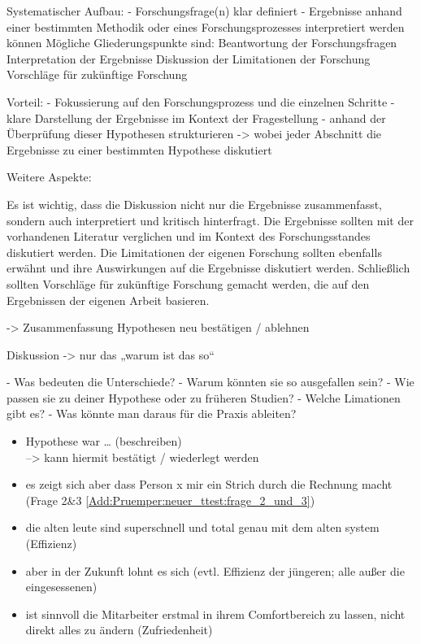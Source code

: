 


Systematischer Aufbau:
- Forschungsfrage(n) klar definiert
- Ergebnisse anhand einer bestimmten Methodik oder eines Forschungsprozesses interpretiert werden können
Mögliche Gliederungspunkte sind:
Beantwortung der Forschungsfragen
Interpretation der Ergebnisse
Diskussion der Limitationen der Forschung
Vorschläge für zukünftige Forschung

Vorteil:
- Fokussierung auf den Forschungsprozess und die einzelnen Schritte
- klare Darstellung der Ergebnisse im Kontext der Fragestellung
- anhand der Überprüfung dieser Hypothesen strukturieren
-> wobei jeder Abschnitt die Ergebnisse zu einer bestimmten Hypothese diskutiert 

Weitere Aspekte:

    Es ist wichtig, dass die Diskussion nicht nur die Ergebnisse zusammenfasst, sondern auch interpretiert und kritisch hinterfragt.
    Die Ergebnisse sollten mit der vorhandenen Literatur verglichen und im Kontext des Forschungsstandes diskutiert werden.
    Die Limitationen der eigenen Forschung sollten ebenfalls erwähnt und ihre Auswirkungen auf die Ergebnisse diskutiert werden.
    Schließlich sollten Vorschläge für zukünftige Forschung gemacht werden, die auf den Ergebnissen der eigenen Arbeit basieren. 

-> Zusammenfassung Hypothesen neu bestätigen / ablehnen

Diskussion
->	nur das „warum ist das so“

- Was bedeuten die Unterschiede?
- Warum könnten sie so ausgefallen sein?
- Wie passen sie zu deiner Hypothese oder zu früheren Studien?
- Welche Limationen gibt es?
- Was könnte man daraus für die Praxis ableiten?

\begin{itemize}
    \item Hypothese war … (beschreiben)\\
        --> kann hiermit bestätigt / wiederlegt werden
    \item es zeigt sich aber dass Person x mir ein Strich durch die Rechnung macht (Frage 2\&3 \autoref{Add:Pruemper:neuer_ttest:frage_2_und_3})
    \item die alten leute sind superschnell und total genau mit dem alten system (Effizienz)
    \item aber in der Zukunft lohnt es sich (evtl. Effizienz der jüngeren; alle außer die eingesessenen)
    \item ist sinnvoll die Mitarbeiter erstmal in ihrem Comfortbereich zu lassen, nicht direkt alles zu ändern (Zufriedenheit)
\end{itemize}

